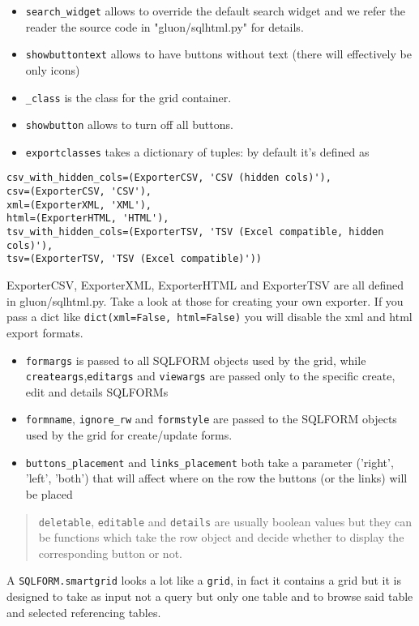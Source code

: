 \documentclass[justified,sixbynine,notoc]{tufte-book}
\def\ft{\small\tt}
\begin{document}
\begin{fullwidth}
\begin{itemize}
\item {\ft search\_widget} allows to override the default search widget and we refer the reader the source code in "gluon/sqlhtml.py" for details.

\item {\ft showbuttontext} allows to have buttons without text (there will effectively be only icons)

\item {\ft \_class} is the class for the grid container.

\item {\ft showbutton} allows to turn off all buttons.

\item {\ft exportclasses} takes a dictionary of tuples: by default it's defined as
\end{itemize}

\begin{lstlisting}
csv_with_hidden_cols=(ExporterCSV, 'CSV (hidden cols)'),
csv=(ExporterCSV, 'CSV'),
xml=(ExporterXML, 'XML'),
html=(ExporterHTML, 'HTML'),
tsv_with_hidden_cols=(ExporterTSV, 'TSV (Excel compatible, hidden cols)'),
tsv=(ExporterTSV, 'TSV (Excel compatible)'))
\end{lstlisting}

ExporterCSV, ExporterXML, ExporterHTML and ExporterTSV are all defined in gluon/sqlhtml.py. Take a look at those for creating your own exporter. If you pass a dict like {\ft dict(xml=False, html=False)} you will disable the xml and html export formats.

\begin{itemize}
\item {\ft formargs} is passed to all SQLFORM objects used by the grid, while {\ft createargs},{\ft editargs} and {\ft viewargs} are passed only to the specific create, edit and details SQLFORMs

\item {\ft formname}, {\ft ignore\_rw} and {\ft formstyle} are passed to the SQLFORM objects used by the grid for create/update forms.

\item {\ft buttons\_placement} and {\ft links\_placement} both take a parameter ('right', 'left', 'both') that will affect where on the row the buttons (or the links) will be placed
\end{itemize}
\begin{quote}{\ft deletable}, {\ft editable} and {\ft details} are usually boolean values but they can be functions which take the row object and decide whether to display the corresponding button or not.\end{quote}
A {\ft SQLFORM.smartgrid} looks a lot like a {\ft grid}, in fact it contains a grid but it is designed to take as input not a query but only one table and to browse said table and selected referencing tables.


\end{fullwidth}
\end{document}
